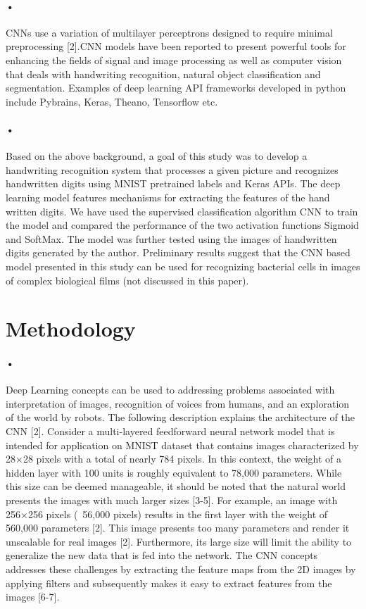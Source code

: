 \documentclass{article}
\begin{document}
\paragraph{•}
CNNs use a variation of multilayer perceptrons designed to require minimal preprocessing [2].CNN models have been reported to present powerful tools for enhancing the fields of signal and image processing as well as computer vision that deals with handwriting recognition, natural object classification and segmentation. Examples of deep learning API frameworks developed in python include Pybrains, Keras, Theano, Tensorflow etc. 
\paragraph{•}
Based on the above background, a goal of this study was to develop a handwriting recognition system that processes a given picture and recognizes handwritten digits using MNIST pretrained labels and Keras APIs. The deep learning model features mechanisms for extracting the features of the hand written digits. We have used  the supervised classification algorithm CNN to train the model and compared the performance of the two activation functions Sigmoid and SoftMax. The model was further tested using the images of handwritten digits generated by the author. Preliminary results suggest that the CNN based model presented in this study can be used for recognizing bacterial cells in images of complex biological films (not discussed in this paper).

\section{Methodology}
\label{Background }
\paragraph{•}

Deep Learning concepts can be used to addressing problems associated with interpretation of images, recognition of voices from humans, and an exploration of the world by robots. The following description explains the architecture of the CNN [2]. Consider a multi-layered feedforward neural network model that is intended for application on MNIST dataset that contains images characterized by 28×28 pixels with a total of nearly 784 pixels. In this context, the weight of a hidden layer with 100 units is roughly equivalent to 78,000 parameters. While this size can be deemed manageable, it should be noted that the natural world presents the images with much larger sizes [3-5]. For example, an image with 256×256 pixels (~56,000 pixels) results in the first layer with the weight  of 560,000 parameters [2]. This image presents too many parameters and render it unscalable for real images [2]. Furthermore, its large size will limit the  ability to generalize the new data that is fed into the network. The CNN concepts addresses these challenges by extracting the feature maps from the 2D images by applying filters and subsequently makes it easy to extract features from the images [6-7].  
\end{document}
